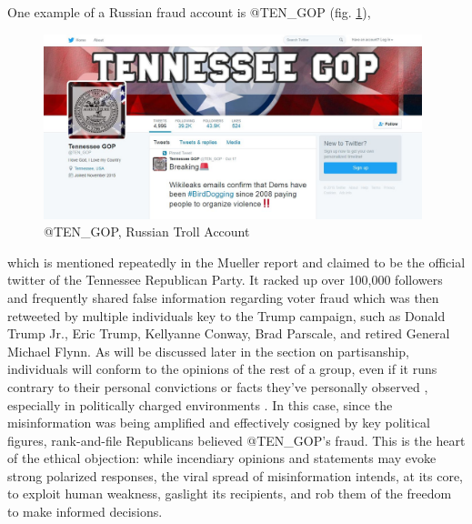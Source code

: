 \documentclass[12pt]{article}
\begin{document}
One example of a Russian fraud account is @TEN\_GOP (fig. \ref{fig:Russian Troll Account @TEN_GOP}), \begin{figure}[h]
    \centering
    \includegraphics[width=11cm]{Ten_GOP.jpeg}
    \caption{@TEN\_GOP, Russian Troll Account}
    \label{fig:Russian Troll Account @TEN_GOP}
\end{figure} which is mentioned repeatedly in the Mueller report and claimed to be the official twitter of the Tennessee Republican Party. It racked up over 100,000 followers and frequently shared false information regarding voter fraud which was then retweeted by multiple individuals key to the Trump campaign, such as Donald Trump Jr., Eric Trump, Kellyanne Conway, Brad Parscale, and retired General Michael Flynn. As will be discussed later in the section on partisanship, individuals will conform to the opinions of the rest of a group, even if it runs contrary to their personal convictions or facts they've personally observed \cite{asch1956studies}, especially in politically charged environments \cite{bullock2007experiments,housholder2014facebook}. In this case, since the misinformation was being amplified and effectively cosigned by key political figures, rank-and-file Republicans believed @TEN\_GOP's fraud. This is the heart of the ethical objection: while incendiary opinions and statements may evoke strong polarized responses, 
the viral spread of misinformation intends, at its core, to exploit human weakness, gaslight its recipients, and rob them of the freedom to make informed decisions.
\end{document}
